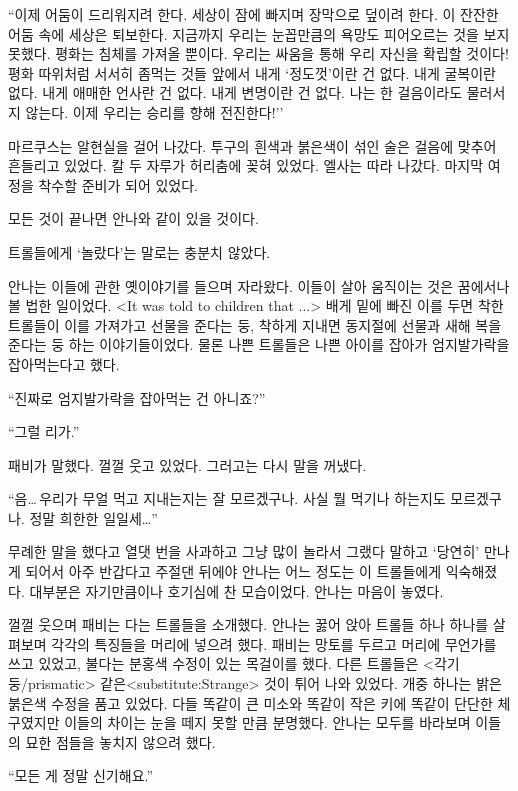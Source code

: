 ``이제 어둠이 드리워지려 한다. 세상이 잠에 빠지며 장막으로 덮이려 한다. 이 잔잔한 어둠 속에 세상은 퇴보한다. 지금까지 우리는 눈꼽만큼의 욕망도 피어오르는 것을 보지 못했다. 평화는 침체를 가져올 뿐이다. 우리는 싸움을 통해 우리 자신을 확립할 것이다! 평화 따위처럼 서서히 좀먹는 것들 앞에서 내게 `정도껏'이란 건 없다. 내게 굴복이란 없다. 내게 애매한 언사란 건 없다. 내게 변명이란 건 없다. 나는 한 걸음이라도 물러서지 않는다. 이제 우리는 승리를 향해 전진한다!''

마르쿠스는 알현실을 걸어 나갔다. 투구의 흰색과 붉은색이 섞인 술은 걸음에 맞추어 흔들리고 있었다. 칼 두 자루가 허리춤에 꽂혀 있었다. 엘사는 따라 나갔다. 마지막 여정을 착수할 준비가 되어 있었다.

모든 것이 끝나면 안나와 같이 있을 것이다.

\textbreak

트롤들에게 `놀랐다'는 말로는 충분치 않았다.

안나는 이들에 관한 옛이야기를 들으며 자라왔다. 이들이 살아 움직이는 것은 꿈에서나 볼 법한 일이었다. <It was told to children that ...> 배게 밑에 빠진 이를 두면 착한 트롤들이 이를 가져가고 선물을 준다는 둥, 착하게 지내면 동지절에 선물과 새해 복을 준다는 둥 하는 이야기들이었다. 물론 나쁜 트롤들은 나쁜 아이를 잡아가 엄지발가락을 잡아먹는다고 했다.

``진짜로 엄지발가락을 잡아먹는 건 아니죠?''

``그럴 리가.''

패비가 말했다. 껄껄 웃고 있었다. 그러고는 다시 말을 꺼냈다.

``음\ldots\,우리가 무얼 먹고 지내는지는 잘 모르겠구나. 사실 뭘 먹기나 하는지도 모르겠구나. 정말 희한한 일일세\ldots''

무례한 말을 했다고 열댓 번을 사과하고 그냥 많이 놀라서 그랬다 말하고 `당연히' 만나게 되어서 아주 반갑다고 주절댄 뒤에야 안나는 어느 정도는 이 트롤들에게 익숙해졌다. 대부분은 자기만큼이나 호기심에 찬 모습이었다. 안나는 마음이 놓였다.

껄껄 웃으며 패비는 다는 트롤들을 소개했다. 안나는 꿇어 앉아 트롤들 하나 하나를 살펴보며 각각의 특징들을 머리에 넣으려 했다. 패비는 망토를 두르고 머리에 무언가를 쓰고 있었고, 불다는 분홍색 수정이 있는 목걸이를 했다. 다른 트롤들은 <각기둥/prismatic> 같은<substitute:Strange> 것이 튀어 나와 있었다. 개중 하나는 밝은 붉은색 수정을 품고 있었다. 다들 똑같이 큰 미소와 똑같이 작은 키에 똑같이 단단한 체구였지만 이들의 차이는 눈을 떼지 못할 만큼 분명했다. 안나는 모두를 바라보며 이들의 묘한 점들을 놓치지 않으려 했다.

``모든 게 정말 신기해요.''

